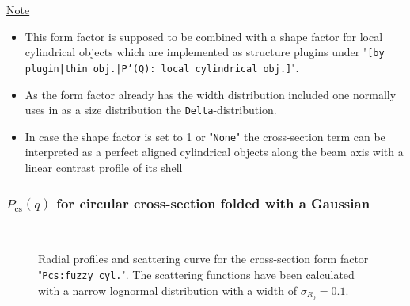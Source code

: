 \noindent
\underline{Note}
\begin{itemize}
  \item This form factor is supposed to be combined with a shape factor for
local cylindrical objects which are implemented as structure  plugins
under "\texttt{[by plugin|thin obj.|P'(Q): local cylindrical obj.]}".
\item As the form factor already has the width distribution included one normally uses in \SASfit as a size distribution
the \texttt{Delta}-distribution.
\item In case the shape factor is set to 1 or "\texttt{None}" the cross-section term can be interpreted as a perfect aligned cylindrical objects along the beam axis with a linear contrast profile of its shell
\end{itemize}
\clearpage
\subsubsection{$P_\mathrm{cs}(q)$ for circular cross-section folded with a Gaussian } ~\\
\label{plugin:Pcs:cyl_fuzzy}
\begin{figure}[htb]
\captionsetup[subfigure]{position=b}
\centering
{}
\hfill
{}
\caption{Radial profiles and scattering curve for the cross-section form factor "\texttt{Pcs:fuzzy cyl.}". The scattering functions have been calculated with a narrow lognormal distribution with a width of $\sigma_{R_0}=0.1$.}
\label{fig:Pcs:cyl_fuzzy}
\end{figure}

